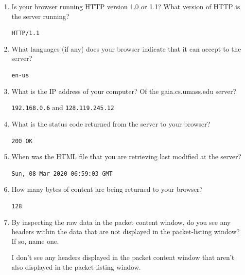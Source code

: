 \documentclass{article}
\begin{document}
\begin{enumerate}

\item Is your browser running HTTP version 1.0 or 1.1? What version of HTTP is the server running?

\texttt{HTTP/1.1}

\item What languages (if any) does your browser indicate that it can accept to the server?

\texttt{en-us}

\item What is the IP address of your computer? Of the gaia.cs.umass.edu server?

\texttt{192.168.0.6}\textsf{ and }\texttt{128.119.245.12}

\item What is the status code returned from the server to your browser?

\texttt{200 OK}

\item When was the HTML file that you are retrieving last modified at the server?

\texttt{Sun, 08 Mar 2020 06:59:03 GMT}

\item How many bytes of content are being returned to your browser?

\texttt{128}

\item By inspecting the raw data in the packet content window, do you see any headers within the data that are not displayed in the packet-listing window? If so, name one.

\textsf{I don't see any headers displayed in the packet content window that aren't also displayed in the packet-listing window.}


\end{enumerate}
\end{document}
